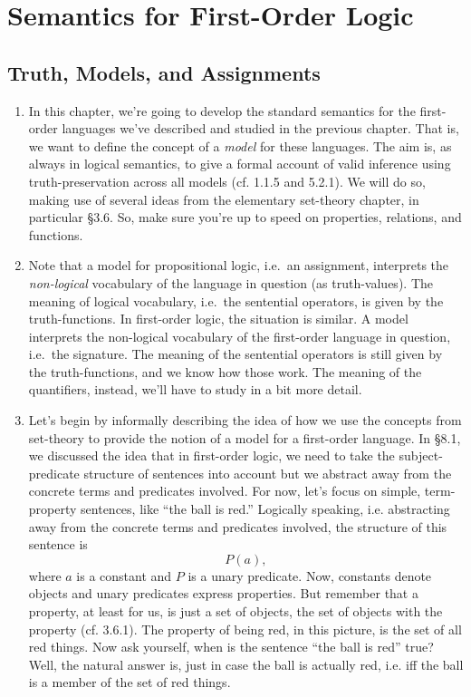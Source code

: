 \chapter{Semantics for First-Order Logic}

\section{Truth, Models, and Assignments}

	\begin{enumerate}[\thesection.1]

		\item In this chapter, we're going to develop the standard semantics for the first-order languages we've described and studied in the previous chapter. That is, we want to define the concept of a \emph{model} for these languages. The aim is, as always in logical semantics, to give a formal account of valid inference using truth-preservation across all models (cf. 1.1.5 and 5.2.1). We will do so, making use of several ideas from the elementary set-theory chapter, in particular \S3.6. So, make sure you're up to speed on properties, relations, and functions.
		
	  \item Note that a model for propositional logic,
		i.e.\ an assignment,
		interprets the \emph{non-logical} vocabulary of the language in question (as truth-values).
		The meaning of logical vocabulary,
		i.e.\ the sentential operators,
		is given by the truth-functions.
		In first-order logic, the situation is similar.
		A model interprets the non-logical vocabulary of the first-order language in question,
		i.e.\ the signature.
		The meaning of the sentential operators is still given by the truth-functions, and we know how those work.
		The meaning of the quantifiers, instead, we'll have to study in a bit more detail.
		
		\item Let's begin by informally describing the idea of how we use the concepts from set-theory to provide the notion of a model for a first-order language. In \S8.1, we discussed the idea that in first-order logic, we need to take the subject-predicate structure of sentences into account but we abstract away from the concrete terms and predicates involved. For now, let's focus on simple, term-property sentences, like ``the ball is red.'' Logically speaking, i.e. abstracting away from the concrete terms and predicates involved, the structure of this sentence is \[P(a),\] where $a$ is a constant and $P$ is a unary predicate. Now, constants denote objects and unary predicates express properties. But remember that a property, at least for us, is just a set of objects, the set of objects with the property (cf. 3.6.1). The property of being red, in this picture, is the set of all red things. Now ask yourself, when is the sentence ``the ball is red'' true? Well, the natural answer is, just in case the ball is actually red, i.e. iff the ball is a member of the set of red things. 
		

\end{enumerate}
